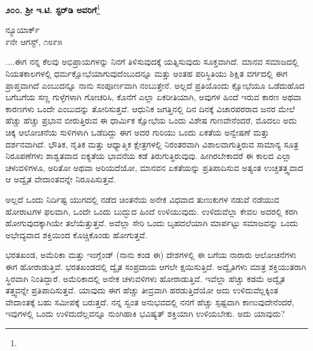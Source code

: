 \begin{center}
\textbf{೨೦೦. ಶ‍್ರೀ ಇ.ಟಿ. ಸ್ಟರ್‌ಡಿ ಅವರಿಗೆ}\footnote{}
\end{center}

\vspace{-0.3cm}

\begin{flushright}
ನ್ಯೂಯಾರ್ಕ್\\೯ನೇ ಆಗಸ್ಟ್, ೧೮೯೫
\end{flushright}

....ಈಗ ನನ್ನ ಕೆಲವು ಅಭಿಪ್ರಾಯಗಳನ್ನು ನಿನಗೆ ತಿಳಿಸುವುದಕ್ಕೆ ಯತ್ನಿಸುವುದು ಸೂಕ್ತವಾಗಿದೆ. ಮಾನವ ಸಮಾಜದಲ್ಲಿ ನಿಯತಕಾಲಗಳಲ್ಲಿ ಧರ್ಮಕ್ಷೋಭೆಯಾಗುವುದೆಂಬುದನ್ನೂ ಮತ್ತು ಅಂತಹ ಪರಿಸ್ಥಿತಿಯು ಶಿಕ್ಷಿತ ವರ್ಗದಲ್ಲಿ ಈಗ ಪ್ರಾಪ್ತವಾಗಿದೆ ಎಂಬುದನ್ನೂ ನಾನು ಸಂಪೂರ್ಣವಾಗಿ ನಂಬುತ್ತೇನೆ. ಅಲ್ಲದೆ ಪ್ರತಿಯೊಂದು ಕ್ಷೋಭೆಯೂ ಒಡೆದುಹೊದ ಬಗೆಬಗೆಯ ಸಣ್ಣ ಗುಳ್ಳೆಗಳಾಗಿ ಗೋಚರಿಸಿ, ಕೊನೆಗೆ ಎಲ್ಲಾ ಏಕರೀತಿಯಾಗಿ, ಅವುಗಳ ಹಿಂದೆ ಇರುವ ಕಾರಣ ಅಥವಾ ಕಾರಣಗಳು ಒಂದೇ ಎಂಬುದನ್ನು ತೋರಿಸು\break ತ್ತವೆ. ಆಧುನಿಕ ಜಗತ್ತಿನಲ್ಲಿ ದಿನ ದಿನಕ್ಕೆ ವಿಚಾರಪರರಾದ ಜನರ ಮೇಲೆ ಹೆಚ್ಚು ಹೆಚ್ಚು ಪ್ರಭಾವ ಬೀರುತ್ತಿರುವ ಈ ಧಾರ್ಮಿಕ ಕ್ಷೋಭೆಯ ಒಂದು ವಿಶೇಷ ಗುಣವೇನೆಂದರೆ, ಮೊದಲು ಅದು ಚಿಕ್ಕ ಆಲೋಚನೆಯ ಸುಳಿಗಳಾಗಿ ಒಡೆದಿದ್ದು ಈಗ ಅದರ ಗುರಿಯು ಒಂದು ಏಕತೆಯ ಅನ್ವೇಷಣೆ ಮತ್ತು ದರ್ಶನವಾಗಿದೆ. ಭೌತಿಕ, ನೈತಿಕ ಮತ್ತು ಆಧ್ಯಾತ್ಮಿಕ ಕ್ಷೇತ್ರಗಳಲ್ಲಿ ನಿರಂತರವಾಗಿ ವಿಶಾಲವಾಗುತ್ತಿರುವ ಸಾಮಾನ್ಯ ಸೂತ್ರ ನಿರೂಪಣೆಗಳು ಶಾಶ್ವತವಾದ ಐಕ್ಯತೆಯ ಭಾವನೆಯ ಕಡೆ ತಿರುಗುತ್ತಿರುವುವು. ಹೀಗಿರಬೇಕಾದರೆ ಈ ಕಾಲದ ಎಲ್ಲಾ ಚಳುವಳಿಗಳೂ, ಅರಿತೋ ಅಥವಾ ಅರಿಯದೆಯೋ, ಮಾನವನ ಏಕತೆಯನ್ನು ಪ್ರತಿಪಾದಿಸುವ ಅತ್ಯಂತ ಉಚ್ಚತತ್ತ್ವವಾದ ಆ ಅದ್ವೈತ ವೇದಾಂತವನ್ನೇ ನಿರೂಪಿಸುತ್ತವೆ.

\vspace{0.1cm}

ಅಲ್ಲದೆ ಒಂದು ನಿರ್ದಿಷ್ಟ ಯುಗದಲ್ಲಿ ನಡೆದ ಚಿಂತನೆಯ ಅನೇಕ ವಿಧವಾದ ತುಣುಕುಗಳ ನಡುವೆ ನಡೆಯುವ ಹೋರಾಟಗಳ ಫಲವಾಗಿ, ಒಂದೇ ಒಂದು ಬುದ್ಭುದ ಹಿಂದೆ ಉಳಿಯುವುದು. ಉಳಿದುವೆಲ್ಲಾ ಕೇವಲ ಅದರಲ್ಲಿ ಕರಗಿ ಹೋಗುವುದಕ್ಕಾಗಿಯೇ ತಲೆಯೆತ್ತುತ್ತವೆ. ಅವೆಲ್ಲಾ ಸೇರಿ ಒಂದು ಬೃಹದಲೆಯಾಗಿ ಮಾರ್ಪಟ್ಟು ಸಮಾಜವನ್ನು ಒಂದು ಅಭೇದ್ಯವಾದ ಶಕ್ತಿಯಿಂದ ಕೊಚ್ಚಿಕೊಂಡು ಹೋಗುತ್ತವೆ.

\vspace{0.1cm}

ಭರತಖಂಡ, ಅಮೆರಿಕಾ ಮತ್ತು ಇಂಗ್ಲೆಂಡ್ (ನಾನು ಕಂಡ ಈ) ದೇಶಗಳಲ್ಲಿ ಈ ಬಗೆಯ ನಾರಾರು ಆಲೋಚನೆಗಳು ಈಗ ಹೋರಾಡುತ್ತಿವೆ. ಭರತಖಂಡದಲ್ಲಿ ದ್ವೈತ ಸಂಪ್ರದಾಯ ಆಗಲೇ ಕ್ಷಯಿಸುತ್ತಿದೆ. ಅದ್ವೈತಿಗಳು ಮಾತ್ರ ಶಕ್ತಿಯುತರಾಗಿ ಸ್ಥಿರವಾಗಿ ನಿಂತಿದ್ದಾರೆ. ಅಮೆರಿಕಾದಲ್ಲಿ ಅನೇಕ ಚಳುವಳಿಗಳು ಹೋರಾಡುತ್ತಿವೆ. ಇವೆಲ್ಲಾ ಹೆಚ್ಚು ಕಡಮೆ ಅದ್ವೈತ ತತ್ತ್ವವನ್ನೇ ಪ್ರತಿಪಾದಿಸುತ್ತವೆ. ಯಾವುದು ಈಗ ಹೆಚ್ಚು ತೀವ್ರವಾಗಿ ಹರಡುತ್ತಿದೆಯೋ ಅದು ಉಳಿದುವೆಲ್ಲಕ್ಕಿಂತ ವೇದಾಂತಕ್ಕೆ ಬಹು ಸಮೀಪಕ್ಕೆ ಬರುತ್ತದೆ. ನನ್ನ ಸ್ವಂತ ಅನುಭವದಲ್ಲಿ ನನಗೆ ಹೆಚ್ಚು ಸ್ಪಷ್ಟವಾಗಿ ಕಾಣುವುದೇನೆಂದರೆ, ಇವುಗಳಲ್ಲಿ ಒಂದು ಉಳಿದುದೆಲ್ಲವನ್ನೂ ನುಂಗಿಹಾಕಿ ಭವಿಷ್ಯತ್ ಶಕ್ತಿಯಾಗಿ ಉಳಿಯಬೇಕು. ಅದು ಯಾವುದು?

